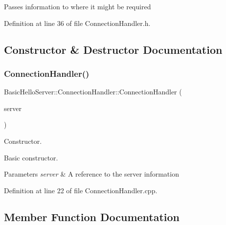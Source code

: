 Passes information to where it might be required 

Definition at line 36 of file Connection\+Handler.\+h.



\subsection{Constructor \& Destructor Documentation}
\mbox{\label{classBasicHelloServer_1_1ConnectionHandler_a11a9fe63bb6df14e9245d59a74276fe7}} 
\subsubsection{\texorpdfstring{ConnectionHandler()}{ConnectionHandler()}}
{\footnotesize\ttfamily Basic\+Hello\+Server\+::\+Connection\+Handler\+::\+Connection\+Handler (\begin{DoxyParamCaption}\item[{\mbox{\hyperlink{classBasicHelloServer_1_1ServerSetup}{Server\+Setup}} \&}]{server }\end{DoxyParamCaption})\hspace{0.3cm}{\ttfamily [explicit]}}



Constructor. 

Basic constructor.


\begin{DoxyParams}{Parameters}
{\em server} & A reference to the server information \\
\hline
\end{DoxyParams}


Definition at line 22 of file Connection\+Handler.\+cpp.



\subsection{Member Function Documentation}
\mbox{\label{classBasicHelloServer_1_1ConnectionHandler_a02a368e291a152cf8f7efc5cfceaecd3}} 
